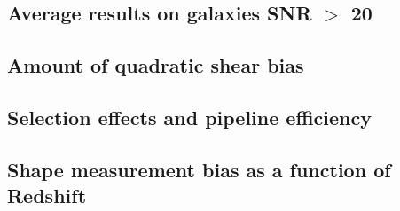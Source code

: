 \documentclass[useAMS,usenatbib]{mn2e}
\begin{document}
\subsection{Average results on galaxies SNR $>$ 20}


\subsection{Amount of quadratic shear bias}


\subsection{Selection effects and pipeline efficiency }


\subsection{Shape measurement bias as a function of Redshift}

\end{document}
